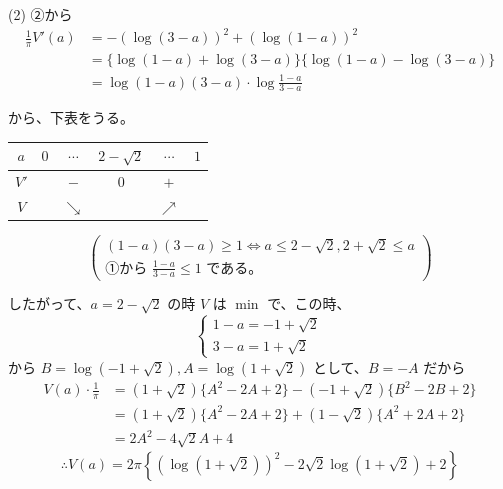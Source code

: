 \documentclass[../main.tex]{subfiles}
\begin{document}
(2) ②から
\begin{align*}
  \frac{1}{\pi} V'(a) &= - (\log(3-a))^2 + (\log(1-a))^2 \\
  &= \{ \log(1-a) + \log(3-a) \} \{ \log(1-a) - \log(3-a) \} \\
  &= \log(1-a)(3-a) \cdot \log \frac{1-a}{3-a}
\end{align*}

から、下表をうる。

\begin{center}
  \begin{tabular}{|c|c|c|c|c|c|}
    \hline
    $a$ & $0$ & $\cdots$ & $2-\sqrt{2}$ & $\cdots$ & $1$ \\ \hline
    $V'$ & & $-$ & $0$ & $+$ & \\ \hline
    $V$ & & $\searrow$ & & $\nearrow$ & \\ \hline
  \end{tabular}
\end{center}

\[
  \left(
    \begin{array}{l}
      (1-a)(3-a) \ge 1 \iff a \le 2-\sqrt{2}, 2+\sqrt{2} \le a \\
      \text{①から } \frac{1-a}{3-a} \le 1 \text{ である。}
  \end{array} \right)
\]

したがって、$a = 2-\sqrt{2}$ の時 $V$ は $\min$ で、この時、
\[
  \begin{cases}
    1-a = -1+\sqrt{2} \\
    3-a = 1+\sqrt{2}
  \end{cases}
\]
から $B = \log(-1+\sqrt{2}), A = \log(1+\sqrt{2})$ として、$B = -A$ だから
\begin{align*}
  V(a) \cdot \frac{1}{\pi} &= (1+\sqrt{2}) \{ A^2 - 2A + 2 \} - (-1+\sqrt{2}) \{ B^2 - 2B + 2 \} \\
  &= (1+\sqrt{2}) \{ A^2 - 2A + 2 \} + (1-\sqrt{2}) \{ A^2 + 2A + 2 \} \\
  &= 2A^2 - 4\sqrt{2}A + 4
\end{align*}
\[
  \therefore V(a) = 2\pi \left\{ (\log(1+\sqrt{2}))^2 - 2\sqrt{2}\log(1+\sqrt{2}) + 2 \right\}
\]
\end{document}
